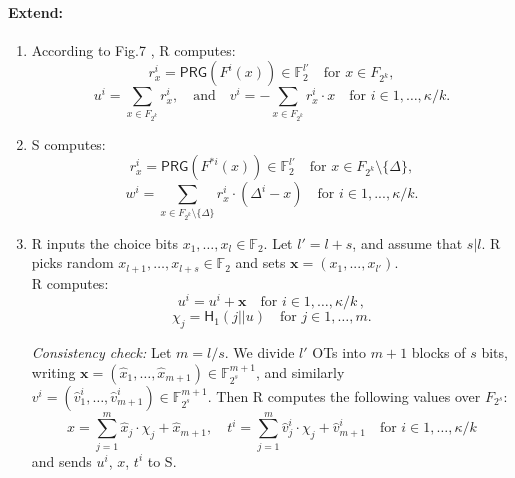 \documentclass{article}
\begin{document}
\paragraph{Extend:}

  \begin{enumerate}
     \item According to Fig.7 \cite{roy2022softspokenot}, R computes: \\
        \begin{displaymath}
            r_x^{i} = \mathsf{PRG}(F^{i}(x)) \in \mathbb{F}_2^{l'} \quad \textrm{for} \,\, x \in F_{2^k},
        \end{displaymath}
        \begin{displaymath}
            u^i = \sum_{x \in F_{2^k}} r_x^{i}, \quad \textrm{and} \quad v^i = -\sum_{x \in F_{2^k}} r_x^{i} \cdot x \quad \textrm{for} \,\, i \in 1, \dots, \kappa / k.
        \end{displaymath}

    \item S computes: \\
        \begin{displaymath}
            r_x^{i} = \mathsf{PRG}(F^{*i}(x)) \in \mathbb{F}_2^{l'} \quad \textrm{for} \,\, x \in F_{2^k} \setminus \{\Delta\},
        \end{displaymath}
        \begin{displaymath}
            w^i = \sum_{x \in F_{2^k} \setminus \{\Delta\}} r_x^{i} \cdot (\Delta^i - x) \quad \textrm{for} \,\, i \in 1, ..., \kappa / k.
        \end{displaymath}
      
    \item R inputs the choice bits $x_1, \dots, x_l \in \mathbb{F}_2$. Let $l' = l + s$, and assume that $s|l$. R picks random $x_{l+1}, \dots, x_{l+s} \in \mathbb{F}_2$ and sets $\mathbf{x} = (x_1, ..., x_{l'})$. \\
    
    R computes:
    \begin{displaymath}
        u^i = u^i + \mathbf{x} \quad \textrm{for} \,\, i \in 1, \dots, \kappa / k \,,
    \end{displaymath}
    \begin{displaymath}
        \chi_j = \mathsf{H}_1(j || u) \quad \textrm{for} \,\, j \in 1, \dots, m.
    \end{displaymath} 
    
    \emph{Consistency check:} Let $m = l/s$. We divide $l'$ OTs into $m+1$ blocks of $s$ bits,
        writing $\mathbf{x} = (\hat{x}_1, \dots, \hat{x}_{m+1}) \in \mathbb{F}_{2^s}^{m+1}$,
        and similarly
        $v^i = (\hat{v}^i_1, \dots, \hat{v}^i_{m+1}) \in \mathbb{F}_{2^s}^{m+1}$. Then R computes the following values over $F_{2^s}$: 
    \begin{displaymath}
        x = \sum_{j=1}^m \hat{x}_j \cdot \chi_j + \hat{x}_{m+1}, \quad 
        t^i = \sum_{j=1}^m \hat{v}^i_j \cdot \chi_j + \hat{v}^i_{m+1} \quad \textrm{for} \,\, i \in 1, \dots, \kappa / k
    \end{displaymath}        
    and sends $u^i$, $x$, $t^i$ to S.


\end{enumerate}
\end{document}
